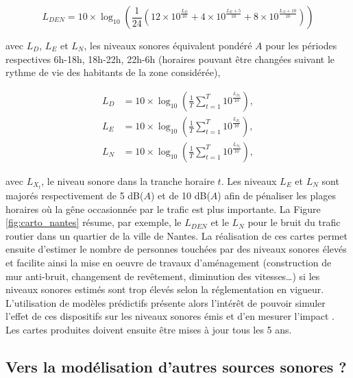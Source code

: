 \begin{equation}
L_{DEN} = 10\times\log_{10} \left(\frac{1}{24} \left(12\times10^{\frac{L_D}{10}}+4\times10^{\frac{L_E+5}{10}}+8\times10^{\frac{L_N+10}{10}} \right)\right)
\end{equation}

avec $L_D$, $L_E$ et $L_N$, les niveaux sonores équivalent pondéré $A$ pour les périodes respectives 6h-18h, 18h-22h, 22h-6h (horaires pouvant être changées suivant le rythme de vie des habitants de la zone considérée),

\begin{subequations}
\begin{align}
L_D &= 10\times\log_{10}\left(\frac{1}{T} \sum_{t = 1}^{T}10^{\frac{L_{D_t}}{10}}\right),\\
L_E &= 10\times\log_{10}\left(\frac{1}{T} \sum_{t = 1}^{T}10^{\frac{L_{E_t}}{10}}\right),\\
L_N &= 10\times\log_{10}\left(\frac{1}{T} \sum_{t = 1}^{T}10^{\frac{L_{N_t}}{10}}\right),
\end{align}
\end{subequations}

avec $L_{X_t}$, le niveau sonore dans la tranche horaire $t$. Les niveaux $L_E$ et $L_N$ sont majorés respectivement de 5 dB($A$) et de 10 dB($A$) afin de pénaliser les plages horaires où la gêne occasionnée par le trafic est plus importante. La Figure \ref{fig:carto_nantes} résume, par exemple, le $L_{DEN}$ et le $L_N$ pour le bruit du trafic routier dans un quartier de la ville de Nantes.
La réalisation de ces cartes permet ensuite d'estimer le nombre  de personnes touchées par des niveaux sonores élevés et facilite ainsi la mise en oeuvre de travaux d'aménagement (construction de mur anti-bruit, changement de revêtement, diminution des vitesses\dots) si les niveaux sonores estimés sont trop élevés selon la réglementation en vigueur. L'utilisation de modèles prédictifs présente alors l'intérêt de pouvoir simuler l'effet de ces dispositifs sur les niveaux sonores émis et d'en mesurer l'impact \cite{murphy2011scenario,guedes2011influence}. Les cartes produites doivent ensuite être mises à jour tous les 5 ans.


\subsection{Vers la modélisation d'autres sources sonores ?}

